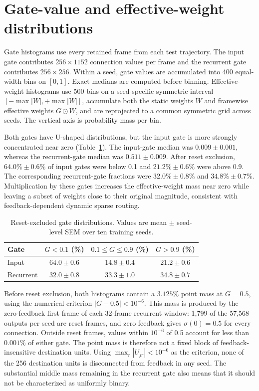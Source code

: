 \section{Gate-value and effective-weight distributions}
\label{app:gate-distributions}

Gate histograms use every retained frame from each test trajectory. The input gate contributes \(256\times1152\) connection values per frame and the recurrent gate contributes \(256\times256\). Within a seed, gate values are accumulated into 400 equal-width bins on \([0,1]\). Exact medians are computed before binning. Effective-weight histograms use 500 bins on a seed-specific symmetric interval \([-\max|W|,+\max|W|]\), accumulate both the static weights \(W\) and framewise effective weights \(G\odot W\), and are reprojected to a common symmetric grid across seeds. The vertical axis is probability mass per bin.

Both gates have U-shaped distributions, but the input gate is more strongly concentrated near zero (Table~\ref{tab:gate-distributions}). The input-gate median was \(0.009\pm0.001\), whereas the recurrent-gate median was \(0.511\pm0.009\). After reset exclusion, \(64.0\%\pm0.6\%\) of input gates were below 0.1 and \(21.2\%\pm0.6\%\) were above 0.9. The corresponding recurrent-gate fractions were \(32.0\%\pm0.8\%\) and \(34.8\%\pm0.7\%\). Multiplication by these gates increases the effective-weight mass near zero while leaving a subset of weights close to their original magnitude, consistent with feedback-dependent dynamic sparse routing.

\begin{table}[t]
\centering
\caption{Reset-excluded gate distributions. Values are mean \(\pm\) seed-level SEM over ten training seeds.}
\label{tab:gate-distributions}
\begin{tabular}{lccc}
\toprule
Gate & \(G<0.1\) (\%) & \(0.1\leq G\leq0.9\) (\%) & \(G>0.9\) (\%) \\
\midrule
Input & \(64.0\pm0.6\) & \(14.8\pm0.4\) & \(21.2\pm0.6\) \\
Recurrent & \(32.0\pm0.8\) & \(33.3\pm1.0\) & \(34.8\pm0.7\) \\
\bottomrule
\end{tabular}
\end{table}

Before reset exclusion, both histograms contain a \(3.125\%\) point mass at \(G=0.5\), using the numerical criterion \(|G-0.5|<10^{-6}\). This mass is produced by the zero-feedback first frame of each 32-frame recurrent window: 1,799 of the 57,568 outputs per seed are reset frames, and zero feedback gives \(\sigma(0)=0.5\) for every connection. Outside reset frames, values within \(10^{-6}\) of 0.5 account for less than \(0.001\%\) of either gate. The point mass is therefore not a fixed block of feedback-insensitive destination units. Using \(\max_r|U_{jr}|<10^{-6}\) as the criterion, none of the 256 destination units is disconnected from feedback in any seed. The substantial middle mass remaining in the recurrent gate also means that it should not be characterized as uniformly binary.

